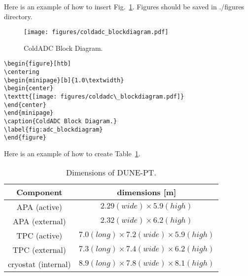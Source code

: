 \label{sec:appendix}

Here is an example of how to insert Fig.~\ref{fig:adc_blockdiagram}. Figures should be saved in ./figures directory.

\begin{figure}[htb]
\centering
\begin{minipage}[b]{1.0\textwidth}
\begin{center}
\texttt{[image: figures/coldadc\_blockdiagram.pdf]}
\end{center}
\end{minipage}
\caption{ColdADC Block Diagram.}
\label{fig:adc_blockdiagram}
\end{figure}

\begin{verbatim}
\begin{figure}[htb]
\centering
\begin{minipage}[b]{1.0\textwidth}
\begin{center}
\texttt{[image: figures/coldadc\_blockdiagram.pdf]}
\end{center}
\end{minipage}
\caption{ColdADC Block Diagram.}
\label{fig:adc_blockdiagram}
\end{figure}
\end{verbatim}


\newpage
Here is an example of how to create Table~\ref{tab:TPC-dim}.

\begin{table}[h]
\centering
\begin{tabular}{|c|c|}
\hline
\textbf{ Component } & dimensions [m]  \\ \hline \hline
APA  (active) &  $2.29 (wide) \times 5.9 (high)$ \\ \hline
APA  (external) &  $2.32 (wide) \times 6.2 (high)$ \\ \hline
TPC (active)       & $7.0 (long) \times 7.2 (wide) \times 5.9 (high)$  \\ \hline
TPC (external)       & $7.3 (long) \times 7.4 (wide) \times 6.2 (high)$  \\ \hline
cryostat (internal) &  $8.9 (long) \times 7.8 (wide) \times 8.1 (high)$  \\ \hline
\end{tabular}
\caption{Dimensions of DUNE-PT.}
\label{tab:TPC-dim}
\end{table}


